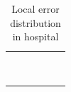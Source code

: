 \begin{table}[!ht]
\caption{\label{tab:local_errors_hospital} Local error distribution in hospital}
\centering
\begin{tabular}{r|K|K|K|K|K}
\toprule
{} &  &  &  &  &   \\ \midrule
{}        &         &          &                 &         &       \\
        &         &          &                &         &       \\
        &         &         &                &         &       \\
        &         &         &                &         &       \\
       &         &         &               &         &       \\
       &         &        &               &         &       \\
       &         &        &               &         &       \\ 
      &         &        &              &         &       \\
      &         &       &              &         &       \\
\bottomrule
\end{tabular}
\end{table}

